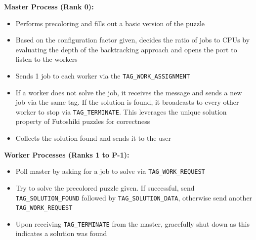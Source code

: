 \textbf{Master Process (Rank 0):}
\begin{itemize}
    \item Performs precoloring and fills out a basic version of the puzzle
    \item Based on the configuration factor given, decides the ratio of jobs to CPUs by evaluating the depth of the backtracking approach and opens the port to listen to the workers
    \item Sends 1 job to each worker via the \texttt{TAG\_WORK\_ASSIGNMENT}
    \item If a worker does not solve the job, it receives the message and sends a new job via the same tag. If the solution is found, it broadcasts to every other worker to stop via \texttt{TAG\_TERMINATE}. This leverages the unique solution property of Futoshiki puzzles for correctness
    \item Collects the solution found and sends it to the user
\end{itemize}

\textbf{Worker Processes (Ranks 1 to P-1):}
\begin{itemize}
    \item Poll master by asking for a job to solve via \texttt{TAG\_WORK\_REQUEST}
    \item Try to solve the precolored puzzle given. If successful, send \texttt{TAG\_SOLUTION\_FOUND} followed by \texttt{TAG\_SOLUTION\_DATA}, otherwise send another \texttt{TAG\_WORK\_REQUEST}
    \item Upon receiving \texttt{TAG\_TERMINATE} from the master, gracefully shut down as this indicates a solution was found
\end{itemize}


